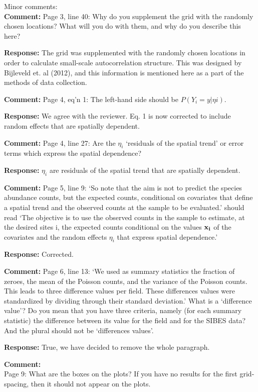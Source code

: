 \documentclass{letter}
\begin{document}
\begin{letter}
Minor comments:\\

\textbf{Comment:} 
Page 3, line 40: Why do you supplement the grid with the randomly chosen locations?  What will you do with them, and why do you describe this here?

\textbf{Response:}
The grid was supplemented with the randomly chosen locations in order to calculate small-scale autocorrelation structure. This was designed by Bijleveld et. al (2012), and this information is mentioned here as a part of the methods of data collection.

\textbf{Comment:} 
Page 4, eq'n 1: The left-hand side should be $P(Y_{i}= y | \eta{i})$.

\textbf{Response:}
We agree with the reviewer. Eq. 1 is now corrected to include random effects that are spatially dependent.

\textbf{Comment:} 
Page 4, line 27: Are the $\eta_i$ `residuals of the spatial trend' or error terms which express the spatial dependence?

\textbf{Response:}
$\eta_i$ are residuals of the spatial trend that are spatially dependent.

\textbf{Comment:} 
Page 5, line 9: `So note that the aim is not to predict the species abundance counts, but the expected counts, conditional on covariates that define a spatial trend and the observed counts at the sample to be evaluated.' should read `The objective is to use the observed counts in the sample to estimate, at the desired sites i, the expected counts conditional on the values $\bf{x}_i$ of the covariates and the random effects $\eta_i$ that express spatial dependence.' 

\textbf{Response:}
Corrected.

\textbf{Comment:} 
Page 6, line 13: `We used as summary statistics the fraction of zeroes, the mean of the Poisson counts, and the variance of the Poisson counts.  This leads to three difference values per field. These differences values were standardized by dividing through their standard deviation.' What is a `difference value'?  Do you mean that you have three criteria, namely (for each summary statistic) the difference between its value for the field and for the SIBES data? And the plural should not be `differences values'.

\textbf{Response:}
True, we have decided to remove the whole paragraph. 

\textbf{Comment:} \\
Page 9: What are the boxes on the plots? If you have no results for the first grid-spacing, then it should not appear on the plots.


\end{letter}
\end{document}
